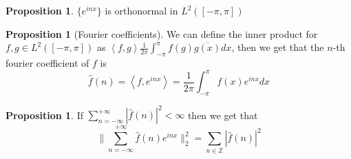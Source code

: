 \documentclass[13pt]{article}
\newcommand{\inprod}[1]{\left\langle #1 \right\rangle}
\theoremstyle{definition} --- default
\newtheorem{proposition}[theorem]{Proposition}
\theoremstyle{definition}
\theoremstyle{remark}
\begin{document}
\begin{proposition}
	$\{e^{inx}\}$ is orthonormal in $L^2([-\pi,\pi])$

\end{proposition}
\begin{proposition}[Fourier coefficients]
	We can define the inner product for $f,g \in L^2([-\pi,\pi])$ as  $\displaystyle \inprod{f,g} \frac{1}{2\pi} \int_{-\pi}^\pi f(g) \overline{g(x)}dx $, then we get that the $n$-th fourier coefficient of $f$ is $$\hat{f}(n) = \inprod{f,e^{inx}} =\frac{1}{2\pi} \int_{-\pi}^\pi f(x) e^{inx} dx $$
\end{proposition}
\begin{proposition}
	If $\sum_{n=-\infty}^{+\infty} |\hat{f}(n)|^2 < \infty$ then we get that $$\|\sum_{n=-\infty}^{+\infty} \hat{f}(n)e^{inx} \|_2^2 = \sum_{n \in \mathbb{Z}} |\hat{f}(n)|^2$$
\end{proposition}
\end{document}
